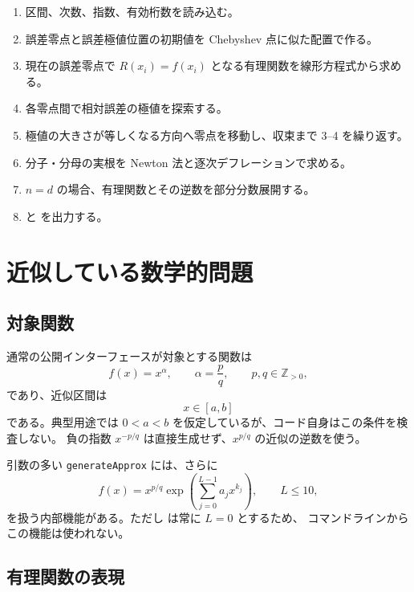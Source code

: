 \documentclass[a4paper,11pt]{ltjsarticle}
\newcommand{\code}[1]{\texttt{#1}}
\begin{document}
\begin{enumerate}
  \item 区間、次数、指数、有効桁数を読み込む。
  \item 誤差零点と誤差極値位置の初期値を Chebyshev 点に似た配置で作る。
  \item 現在の誤差零点で \(R(x_i)=f(x_i)\) となる有理関数を線形方程式から求める。
  \item 各零点間で相対誤差の極値を探索する。
  \item 極値の大きさが等しくなる方向へ零点を移動し、収束まで 3--4 を繰り返す。
  \item 分子・分母の実根を Newton 法と逐次デフレーションで求める。
  \item \(n=d\) の場合、有理関数とその逆数を部分分数展開する。
  \item {} と  を出力する。
\end{enumerate}

\section{近似している数学的問題}

\subsection{対象関数}

通常の公開インターフェースが対象とする関数は
\begin{equation}
  f(x)=x^\alpha,\qquad
  \alpha=\frac{p}{q},\qquad p,q\in\mathbb{Z}_{>0},
  \label{eq:target}
\end{equation}
であり、近似区間は
\begin{equation}
  x\in[a,b]
\end{equation}
である。典型用途では \(0<a<b\) を仮定しているが、コード自身はこの条件を検査しない。
負の指数 \(x^{-p/q}\) は直接生成せず、\(x^{p/q}\) の近似の逆数を使う。

引数の多い \code{generateApprox} には、さらに
\begin{equation}
  f(x)=x^{p/q}\exp\!\left(\sum_{j=0}^{L-1}a_jx^{k_j}\right),
  \qquad L\leq 10,
  \label{eq:exp-target}
\end{equation}
を扱う内部機能がある。ただし  は常に \(L=0\) とするため、
コマンドラインからこの機能は使われない。

\subsection{有理関数の表現}
\end{document}
